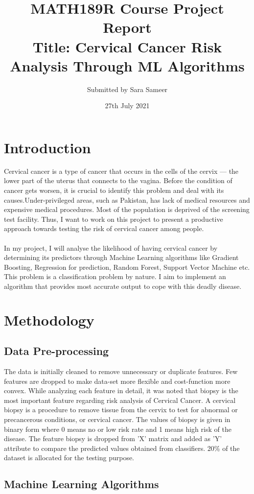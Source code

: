 \documentclass{article}
\title {MATH189R Course Project Report \\
\large Title: Cervical Cancer Risk Analysis Through ML Algorithms  }
\author{Submitted by Sara Sameer }
\date{ 27th July 2021}
\begin{document}
\maketitle
\section*{Introduction}
\smallskip
Cervical cancer is a type of cancer that occurs in the cells of the cervix — the lower part of the uterus that connects to the vagina. Before the condition of cancer gets worsen, it is crucial to identify this problem and deal with its causes.Under-privileged areas, such as Pakistan, has lack of medical resources and expensive medical procedures. Most of the population is deprived of the screening test facility. Thus, I want to work on this project to present a productive approach towards testing the risk of cervical cancer among people.\\\\
\smallskip
In my project, I will analyse the likelihood of having cervical cancer by determining its predictors through Machine Learning algorithms like Gradient Boosting, Regression for prediction, Random Forest, Support Vector Machine etc. This problem is a classification problem by nature. I aim to implement an algorithm that provides most accurate output to cope with this deadly disease.

\section*{Methodology}
\subsection *{Data Pre-processing}
The data is initially cleaned to remove unnecessary or duplicate features. Few features are dropped to make data-set more flexible and cost-function more convex.
While analyzing each feature in detail, it was noted that biopsy is the most important feature regarding risk analysis of Cervical Cancer. A cervical biopsy is a procedure to remove tissue from the cervix to test for abnormal or precancerous conditions, or cervical cancer. The values of biopsy is given in binary form where 0 means no or low risk rate and 1 means high risk of the disease. The feature biopsy is dropped from 'X' matrix and added as 'Y' attribute to compare the predicted values obtained from classifiers. 20\% of the dataset is allocated for the testing purpose. 

\subsection*{Machine Learning Algorithms}
\end{document}
